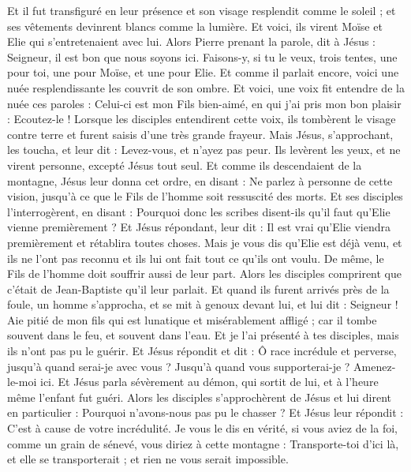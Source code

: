 \begin{multicols}{2}
Et il fut transfiguré en leur présence et son visage resplendit comme le soleil ; et ses vêtements devinrent blancs comme la lumière.
Et voici, ils virent Moïse et Elie qui s'entretenaient avec lui.
Alors Pierre prenant la parole, dit à Jésus : Seigneur, il est bon que nous soyons ici. Faisons-y, si tu le veux, trois tentes, une pour toi, une pour Moïse, et une pour Elie.
Et comme il parlait encore, voici une nuée resplendissante les couvrit de son ombre. Et voici, une voix fit entendre de la nuée ces paroles : Celui-ci est mon Fils bien-aimé, en qui j'ai pris mon bon plaisir : Ecoutez-le !
Lorsque les disciples entendirent cette voix, ils tombèrent le visage contre terre et furent saisis d'une très grande frayeur.
Mais Jésus, s'approchant, les toucha, et leur dit : Levez-vous, et n'ayez pas peur.
Ils levèrent les yeux, et ne virent personne, excepté Jésus tout seul.
Et comme ils descendaient de la montagne, Jésus leur donna cet ordre, en disant : Ne parlez à personne de cette vision, jusqu'à ce que le Fils de l'homme soit ressuscité des morts.
Et ses disciples l'interrogèrent, en disant : Pourquoi donc les scribes disent-ils qu'il faut qu'Elie vienne premièrement ?
Et Jésus répondant, leur dit : Il est vrai qu'Elie viendra premièrement et rétablira toutes choses.
Mais je vous dis qu'Elie est déjà venu, et ils ne l'ont pas reconnu et ils lui ont fait tout ce qu'ils ont voulu. De même, le Fils de l'homme doit souffrir aussi de leur part.
Alors les disciples comprirent que c'était de Jean-Baptiste qu'il leur parlait.
Et quand ils furent arrivés près de la foule, un homme s'approcha, et se mit à genoux devant lui,
et lui dit : Seigneur ! Aie pitié de mon fils qui est lunatique et misérablement affligé ; car il tombe souvent dans le feu, et souvent dans l'eau.
Et je l'ai présenté à tes disciples, mais ils n'ont pas pu le guérir.
Et Jésus répondit et dit : Ô race incrédule et perverse, jusqu'à quand serai-je avec vous ? Jusqu'à quand vous supporterai-je ? Amenez-le-moi ici.
Et Jésus parla sévèrement au démon, qui sortit de lui, et à l'heure même l'enfant fut guéri.
Alors les disciples s'approchèrent de Jésus et lui dirent en particulier : Pourquoi n'avons-nous pas pu le chasser ?
Et Jésus leur répondit : C'est à cause de votre incrédulité. Je vous le dis en vérité, si vous aviez de la foi, comme un grain de sénevé, vous diriez à cette montagne : Transporte-toi d'ici là, et elle se transporterait ; et rien ne vous serait impossible.

\end{multicols}
